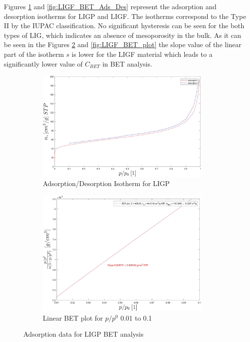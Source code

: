 
Figures \ref{fig:LIGP_BET_Ads_Des} and \ref{fig:LIGF_BET_Ads_Des} represent the adsorption and desorption isotherms for LIGP and LIGF. The isotherms correspond to the Type II by the IUPAC classification. No significant hysteresis can be seen for the both types of LIG, which indicates an absence of mesoporosity in the bulk. As it can be seen in the Figures \ref{fig:LIGP_BET_plot} and \ref{fig:LIGF_BET_plot} the slope value of the linear part of the isotherm $s$ is lower for the LIGF material which leads to a significantly lower value of $C_{BET}$ in BET analysis. 

\begin{figure}[H]
\begin{subfigure}{0.51\textwidth}
\includegraphics[width=0.95\textwidth]{Figures/Results/LIGP_Adsorption_Desorption_Isotherm.jpg} 
\captionsetup{width=0.9\linewidth}
\caption{Adsorption/Desorption Isotherm for LIGP}
\label{fig:LIGP_BET_Ads_Des}
\end{subfigure}
\begin{subfigure}{0.48\textwidth}
\includegraphics[width=0.95\textwidth]{Figures/Results/LIGP_BET_plot.jpg}
\captionsetup{width=0.9\linewidth}
\caption{Linear BET plot for $p/p^0$ 0.01 to 0.1}
\label{fig:LIGP_BET_plot}
\end{subfigure}
\medskip
\caption{Adsorption data for LIGP BET analysis}
\label{fig:LIGP_BET-2}
\end{figure}



